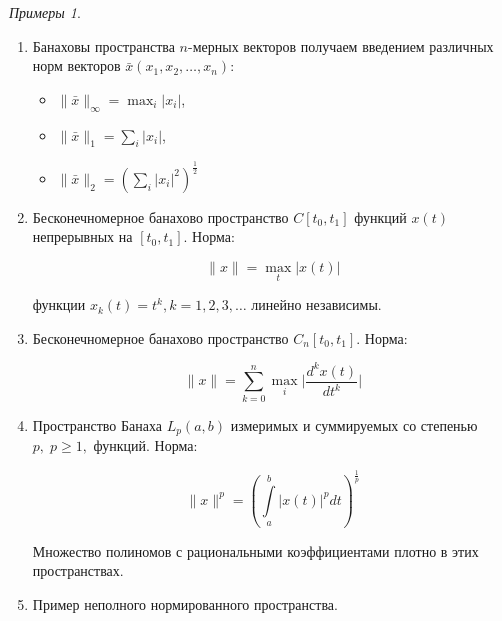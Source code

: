 \documentclass[12pt,a4paper,titlepage,oneside]{book}
\theoremstyle{definition}
\theoremstyle{plain}
\theoremstyle{remark}
\theoremstyle{remark}
\theoremstyle{remark}
\newtheorem*{examples}{Примеры}
\theoremstyle{remark}
\theoremstyle{plain}
\theoremstyle{plain}
\begin{document}
\begin{examples}
\leavevmode
\begin{enumerate}

	\item Банаховы пространства $n$-мерных векторов получаем введением различных норм векторов $\bar{x}(x_1,x_2,\ldots,x_n)$:

	\begin{itemize}

		\item $\lVert \bar{x}\rVert_\infty=\displaystyle\max_{i}\lvert x_i\rvert$,

		\item $\lVert \bar{x}\rVert_1 = \displaystyle\sum_{i}\lvert x_i\rvert$,

		\item $\lVert \bar{x}\rVert_2 = (\displaystyle\sum_{i}\lvert x_i\rvert^2)^{\frac{1}{2}}$

	\end{itemize}

	\item Бесконечномерное банахово пространство $C[t_0,t_1]$ функций $x(t)$ непрерывных на $[t_0,t_1]$. Норма:

	\begin{equation*}
	\lVert x\rVert = \displaystyle\max_{t}\lvert x(t)\rvert
	\end{equation*}

	функции $x_k(t)=t^k, k=1,2,3,\ldots$ линейно независимы.

	\item Бесконечномерное банахово пространство $C_n[t_0,t_1]$. Норма:

	\begin{equation*}
	\lVert x\rVert = \displaystyle\sum_{k=0}^n\max_{i}\lvert\frac{d^kx(t)}{dt^k}\rvert
	\end{equation*}

	\item Пространство Банаха $L_p(a,b)$ измеримых и суммируемых со степенью $p,\;p\geq1,$ функций. Норма:

	\begin{equation*}
	\lVert x\rVert^p = (\int\limits_a^b\lvert x(t)\rvert^pdt)^{\frac{1}{p}}
	\end{equation*}

	Множество полиномов с рациональными коэффициентами плотно в этих пространствах.

	\item Пример неполного нормированного пространства.


\end{enumerate}
\end{examples}
\end{document}
